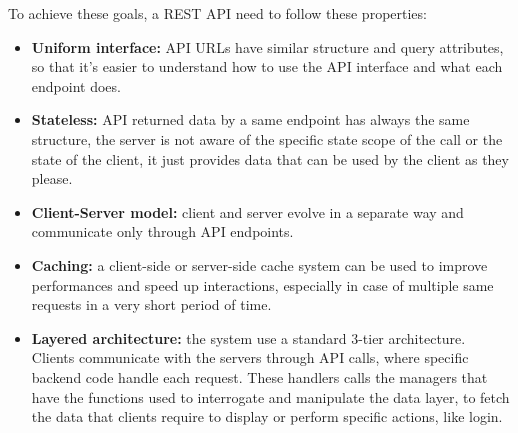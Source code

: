To achieve these goals, a REST API need to follow these properties:
\begin{itemize}
	\item \textbf{Uniform interface:} API URLs have similar structure and query attributes, so that it's easier to understand how to use the API interface and what each endpoint does.
	\item \textbf{Stateless:} API returned data by a same endpoint has always the same structure, the server is not aware of the specific state scope of the call or the state of the client, it just provides data that can be used by the client as they please.  
	\item \textbf{Client-Server model:} client and server evolve in a separate way and communicate only through API endpoints.
	\item \textbf{Caching:} a client-side or server-side cache system can be used to improve performances and speed up interactions, especially in case of multiple same requests in a very short period of time.
	\item \textbf{Layered architecture:} the system use a standard 3-tier architecture. Clients communicate with the servers through API calls, where specific backend code handle each request. These handlers calls the managers that have the functions used to interrogate and manipulate the data layer, to fetch the data that clients require to display or perform specific actions, like login.
\end{itemize}